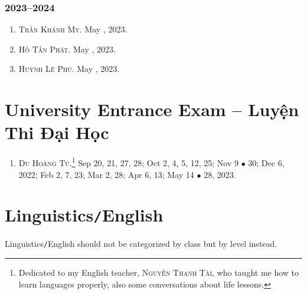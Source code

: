 \documentclass{article}
\begin{document}
\subsubsection{2023--2024}

\begin{enumerate}
	\item \textsc{Trần Khánh My.} May , 2023.
	\item \textsc{Hồ Tấn Phát.} May , 2023.
	\item \textsc{Huỳnh Lê Phú.} May , 2023.
\end{enumerate}


\section{University Entrance Exam -- Luyện Thi Đại Học}

\begin{enumerate}
	\item \textsc{Du Hoàng Tú.}\footnote{Dedicated to my English teacher, \textsc{Nguyễn Thanh Tài}, who taught me how to learn languages properly, also some conversations about life lessons.} {\sf[In]} Sep 20, 21, 27, 28; Oct 2, 4, 5, 12, 25; Nov 9 $\bullet$ 30; Dec 6, 2022; Feb 2, 7, 23; Mar 2, 28; Apr 6, 13; May 14 $\bullet$ 28, 2023.
\end{enumerate}


\section{Linguistics\texttt{/}English}
Linguistics\texttt{/}English should not be categorized by class but by level instead.


\printbibliography[heading=bibintoc]
	
\end{document}
